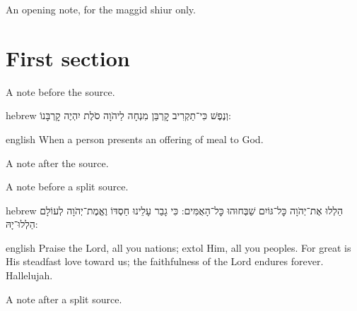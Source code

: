 

\maketitle

\begin{hearah}
An opening note, for the maggid shiur only.
\end{hearah}

\section{First section}

\begin{mekor}
\begin{hearah}
A note before the source.
\end{hearah}
\begin{mekorlang}{hebrew}
וְנֶפֶשׁ כִּי־תַקְרִיב קׇרְבַּן מִנְחָה לַיהֹוָה סֹלֶת יִהְיֶה קׇרְבָּנוֹ:
\end{mekorlang}
\begin{mekorlang}{english}
When a person presents an offering of meal to God.
\end{mekorlang}
\begin{hearah}
A note after the source.
\end{hearah}
\end{mekor}



\begin{mekor}
\begin{hearah}
A note before a split source.
\end{hearah}
\begin{mekorlang}{hebrew}
הַלְלוּ אֶת־יְהֹוָה כׇּל־גּוֹיִם שַׁבְּחוּהוּ כׇּל־הָאֻמִּים:
\mekorbreak
כִּי גָבַר עָלֵינוּ חַסְדּוֹ וֶאֱמֶת־יְהֹוָה לְעוֹלָם הַלְלוּ־יָהּ:
\end{mekorlang}
\begin{mekorlang}{english}
Praise the Lord, all you nations; extol Him, all you peoples.
\mekorbreak
For great is His steadfast love toward us; the faithfulness of the Lord endures forever. Hallelujah.
\end{mekorlang}
\begin{hearah}
A note after a split source.
\end{hearah}
\end{mekor}

